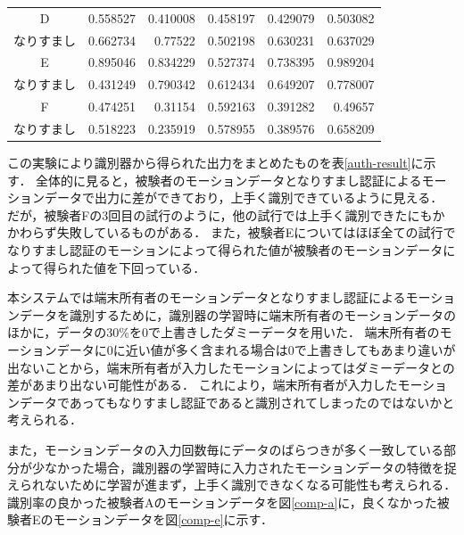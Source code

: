 \begin{table}[btph]
\begin{tabular}{|c|r|r|r|r|r|}
    D & 0.558527 & 0.410008 & 0.458197 & 0.429079 & 0.503082 \\
    なりすまし & 0.662734 & 0.77522 & 0.502198 & 0.630231 & 0.637029 \\ \hline
    E & 0.895046 & 0.834229 & 0.527374 & 0.738395 & 0.989204 \\
    なりすまし & 0.431249 & 0.790342 & 0.612434 & 0.649207 & 0.778007 \\ \hline
    F & 0.474251 & 0.31154 & 0.592163 & 0.391282 & 0.49657 \\
    なりすまし & 0.518223 & 0.235919 & 0.578955 & 0.389576 & 0.658209 \\ \hline
  \end{tabular}
\end{table}

この実験により識別器から得られた出力をまとめたものを表\ref{auth-result}に示す．
全体的に見ると，被験者のモーションデータとなりすまし認証によるモーションデータで出力に差ができており，上手く識別できているように見える．
だが，被験者Fの3回目の試行のように，他の試行では上手く識別できたにもかかわらず失敗しているものがある．
また，被験者Eについてはほぼ全ての試行でなりすまし認証のモーションによって得られた値が被験者のモーションデータによって得られた値を下回っている．

本システムでは端末所有者のモーションデータとなりすまし認証によるモーションデータを識別するために，識別器の学習時に端末所有者のモーションデータのほかに，データの30\%を0で上書きしたダミーデータを用いた．
端末所有者のモーションデータに0に近い値が多く含まれる場合は0で上書きしてもあまり違いが出ないことから，端末所有者が入力したモーションによってはダミーデータとの差があまり出ない可能性がある．
これにより，端末所有者が入力したモーションデータであってもなりすまし認証であると識別されてしまったのではないかと考えられる．

また，モーションデータの入力回数毎にデータのばらつきが多く一致している部分が少なかった場合，識別器の学習時に入力されたモーションデータの特徴を捉えられないために学習が進まず，上手く識別できなくなる可能性も考えられる．
識別率の良かった被験者Aのモーションデータを図\ref{comp-a}に，良くなかった被験者Eのモーションデータを図\ref{comp-e}に示す．

